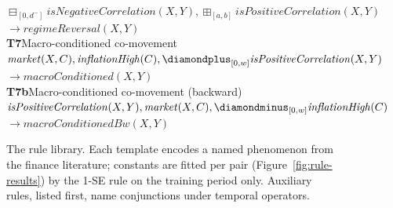 \begin{figure}[t]
{\begin{minipage}{0.95\textwidth}
\hspace*{1.5em}\mbox{$\boxminus_{[0, d^{-}]}\mathit{isNegativeCorrelation}(X,Y), \boxplus_{[a,b]}\mathit{isPositiveCorrelation}(X,Y)$}\\
\hspace*{1.5em}\hspace*{3em}\mbox{$\to \mathit{regimeReversal}(X,Y)$}\\[5pt]
\textbf{T7}\quad Macro-conditioned co-movement~\cite{bekaert2013risk}\hspace{1em plus 1fill}{\footnotesize (fitted constants: $w$)}\\
\hspace*{1.5em}\mbox{$\mathit{market}(X,C), \mathit{inflationHigh}(C), \diamondplus_{[0,w]} \mathit{isPositiveCorrelation}(X,Y)$}\\
\hspace*{1.5em}\hspace*{3em}\mbox{$\to \mathit{macroConditioned}(X,Y)$}\\[5pt]
\textbf{T7b}\quad Macro-conditioned co-movement (backward)~\cite{bekaert2013risk}\hspace{1em plus 1fill}{\footnotesize (fitted constants: $w$)}\\
\hspace*{1.5em}\mbox{$\mathit{isPositiveCorrelation}(X,Y), \mathit{market}(X,C), \diamondminus_{[0,w]} \mathit{inflationHigh}(C)$}\\
\hspace*{1.5em}\hspace*{3em}\mbox{$\to \mathit{macroConditionedBw}(X,Y)$}
\end{minipage}}
\caption{\small{The rule library. Each template encodes a named phenomenon from the finance literature; constants are fitted per pair (Figure~\ref{fig:rule-results}) by the 1-SE rule on the training period only. Auxiliary rules, listed first, name conjunctions under temporal operators.}}
\label{fig:rule-library}
\end{figure}

